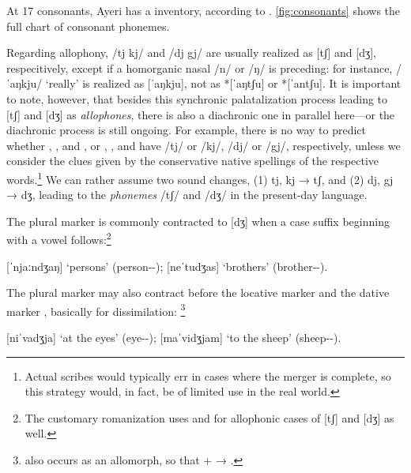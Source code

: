 At 17 consonants, Ayeri has a  inventory, according 
to \citet{wals1}. \autoref{fig:consonants} shows the full chart of consonant 
phonemes.

%
Regarding allophony, /tj kj/ and /dj gj/ are usually realized as [tʃ] and [dʒ], 
respecitively, except if a homorganic nasal /n/ or /ŋ/ is preceding: for 
instance,  /ˈaŋkju/ `really' is realized as [ˈaŋkju], not as 
*[ˈaŋtʃu] or *[ˈantʃu]. It is important to note, however, that besides this 
synchronic palatalization process leading to [tʃ] and [dʒ] as \emph{allophones}, 
there is also a diachronic one in parallel here---or the diachronic process is 
still ongoing. For example, there is no way to predict whether 
, , 
and , or , 
, and  have /tj/ or /kj/, /dj/ 
or /gj/, respectively, unless we consider the clues given by the conservative 
native spellings of the respective words.\footnote{Actual scribes would 
typically err in cases where the merger is complete, so this strategy would, in 
fact, be of limited use in the real world.} We can rather assume two sound 
changes, (1) tj, kj → tʃ, and (2) dj, gj → dʒ, leading to the \emph{phonemes} 
/tʃ/ and /dʒ/ in the present-day language.

The plural marker  is commonly contracted to [dʒ] when a case 
suffix beginning with a vowel follows:\footnote{The customary romanization uses 
 and  for allophonic cases of [tʃ] and [dʒ] as well.}

\pex
	\a {} 
		[ˈnjaːndʒaŋ] `persons' (person-\Pl{}-\Aarg{});
	\a {} [neˈtudʒas] 
		`brothers' (brother-\Pl{}-\Parg{}).
\xe

The plural marker may also contract before the locative marker 
and the dative marker , basically for dissimilation:%
\footnote{ also occurs as an allomorph, so that 
 +  → .}

\pex
	\a {} [niˈvadʒja] `at 
		the eyes' (eye-\Pl{}-\Loc{});
	\a {} [maˈvidʒjam] 
		`to the sheep' (sheep-\Pl{}-\Dat{}).
\xe

